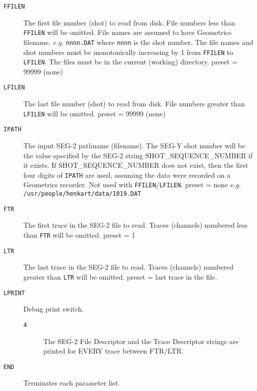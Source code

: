 \begin{description}
\item[\texttt{FFILEN}] The first file number (\gls{shot}) to read from disk.  File numbers
         less than \texttt{FFILEN} will be omitted.  File names are assumed to
         have Geometrics filename.  \textit{e.g.} \texttt{nnnn.DAT}  where \texttt{nnnn} is the
         \gls{shot} number.  The file names and \gls{shot} numbers must be
         monotonically increasing by 1 from \texttt{FFILEN} to \texttt{LFILEN}.  The
         files must be in the current (working) directory.
         \Gls{preset} = 99999 (none)

\item[\texttt{LFILEN}] The last file number (\gls{shot}) to read from disk.  File numbers
         greater than \texttt{LFILEN} will be omitted.
         \Gls{preset} = 99999 (none)

\item[\texttt{IPATH}] The input SEG-2 pathname (filename).  The SEG-Y \gls{shot} number
         will be the value specified by the SEG-2 string
         SHOT\_SEQUENCE\_NUMBER if it exists.  If SHOT\_SEQUENCE\_NUMBER
         does not exist, then the first four digits of \texttt{IPATH} are used,
         assuming the data were recorded on a Geometrics recorder.
         Not used with \texttt{FFILEN}/\texttt{LFILEN}.
         \Gls{preset} = none    \textit{e.g.} \texttt{/usr/people/henkart/data/1019.DAT}

\item[\texttt{FTR}] The first trace in the SEG-2 file to read.  Traces (channels)
         numbered less than \texttt{FTR} will be omitted.
         \Gls{preset} = 1

\item[\texttt{LTR}] The last trace in the SEG-2 file to read.  Traces (channels)
         numbered greater than \texttt{LTR} will be omitted.
         \Gls{preset} = last trace in the file.

\item[\texttt{LPRINT}] Debug print switch.
\begin{description}
\item[\texttt{4}] The SEG-2 File Descriptor and the Trace Descriptor strings
         are printed for EVERY trace between FTR/LTR.
\end{description}

\item[\texttt{END}] Terminates each parameter list.
\end{description}

